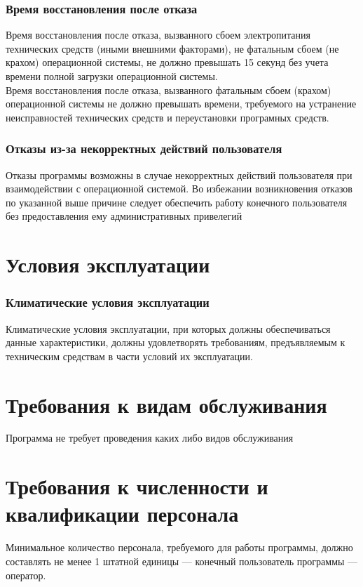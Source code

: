 \subsubsection{Время восстановления после отказа}
Время восстановления после отказа, вызванного сбоем электропитания технических средств (иными внешними факторами), не фатальным сбоем (не крахом) операционной системы, не должно превышать 15 секунд без учета времени полной загрузки операционной системы.\\

Время восстановления после отказа, вызванного фатальным сбоем (крахом) операционной системы не должно превышать времени, требуемого на устранение неисправностей технических средств и переустановки програмных средств.\\
\subsubsection{Отказы из-за некорректных действий пользователя}
Отказы программы возможны в случае некорректных действий пользователя при взаимодействии с операционной системой. Во избежании возникновения отказов по указанной выше причине следует обеспечить работу конечного пользователя без предоставления ему административных привелегий\\
\section{Условия эксплуатации}
\subsubsection{Климатические условия эксплуатации}
Климатические условия эксплуатации, при которых должны обеспечиваться данные характеристики, должны удовлетворять требованиям, предъявляемым к техническим средствам в части условий их эксплуатации.\\
\section{Требования к видам обслуживания}
Программа не требует проведения каких либо видов обслуживания
\section{Требования к численности и квалификации персонала}
Минимальное количество персонала, требуемого для работы программы, должно составлять не менее 1 штатной единицы — конечный пользователь программы — оператор.\\

